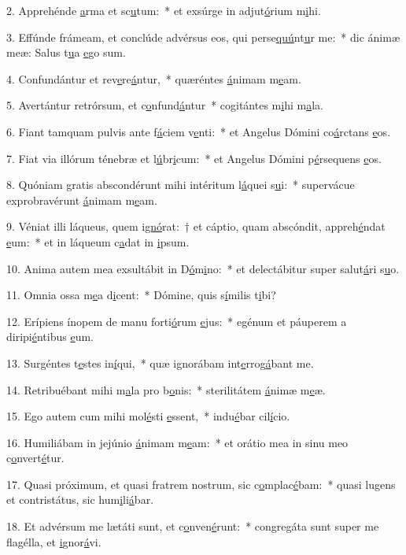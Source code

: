 2. Apprehénde \uline{a}rma et sc\uline{u}tum:~* et exsúrge in adjut\uline{ó}rium m\uline{i}hi.\par 
3. Effúnde frámeam, et conclúde advérsus eos, qui perse\uline{quú}nt\uline{u}r me:~* dic ánimæ meæ: Salus t\uline{u}a \uline{e}go sum.\par 
4. Confundántur et rev\uline{e}re\uline{á}ntur,~* quæréntes \uline{á}nimam m\uline{e}am.\par 
5. Avertántur retrórsum, et c\uline{o}nfund\uline{á}ntur~* cogitántes m\uline{i}hi m\uline{a}la.\par 
6. Fiant tamquam pulvis ante f\uline{á}ciem v\uline{e}nti:~* et Angelus Dómini co\uline{á}rctans \uline{e}os.\par 
7. Fiat via illórum ténebræ et l\uline{ú}br\uline{i}cum:~* et Angelus Dómini p\uline{é}rsequens \uline{e}os.\par 
8. Quóniam gratis abscondérunt mihi intéritum l\uline{á}quei s\uline{u}i:~* supervácue exprobravérunt \uline{á}nimam m\uline{e}am.\par 
9. Véniat illi láqueus, quem i\uline{gnó}rat:~† et cáptio, quam abscóndit, appreh\uline{é}ndat \uline{e}um:~* et in láqueum c\uline{a}dat in \uline{i}psum.\par 
10. Anima autem mea exsultábit in D\uline{ó}m\uline{i}no:~* et delectábitur super salut\uline{á}ri s\uline{u}o.\par 
11. Omnia ossa m\uline{e}a d\uline{i}cent:~* Dómine, quis s\uline{í}milis t\uline{i}bi?\par 
12. Erípiens ínopem de manu forti\uline{ó}rum \uline{e}jus:~* egénum et páuperem a diripi\uline{é}ntibus \uline{e}um.\par 
13. Surgéntes t\uline{e}stes in\uline{í}qui,~* quæ ignorábam int\uline{e}rrog\uline{á}bant me.\par 
14. Retribuébant mihi m\uline{a}la pro b\uline{o}nis:~* sterilitátem \uline{á}nimæ m\uline{e}æ.\par 
15. Ego autem cum mihi mol\uline{é}sti \uline{e}ssent,~* indu\uline{é}bar cil\uline{í}cio.\par 
16. Humiliábam in jejúnio \uline{á}nimam m\uline{e}am:~* et orátio mea in sinu meo c\uline{o}nvert\uline{é}tur.\par 
17. Quasi próximum, et quasi fratrem nostrum, sic c\uline{o}mplac\uline{é}bam:~* quasi lugens et contristátus, sic hum\uline{i}li\uline{á}bar.\par 
18. Et advérsum me lætáti sunt, et c\uline{o}nven\uline{é}runt:~* congregáta sunt super me flagélla, et \uline{i}gnor\uline{á}vi.\par 
